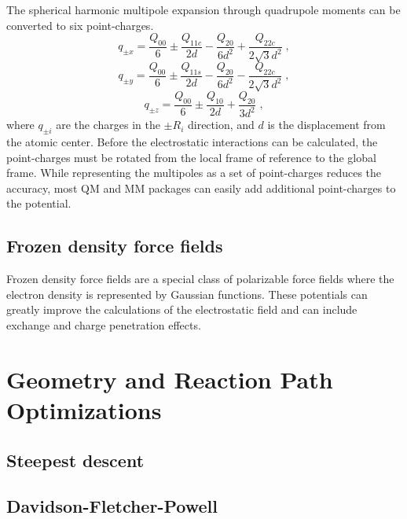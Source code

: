 \documentclass[12pt]{report}
\begin{document}
The spherical harmonic multipole expansion through quadrupole moments can be
converted to six point-charges. \cite{}
\begin{equation}
 q_{\pm x} = \frac{Q_{00}}{6} \pm \frac{Q_{11c}}{2d} -
          \frac{Q_{20}}{6d^2} + \frac{Q_{22c}}{2\sqrt{3}d^2} \; ,
\end{equation}
\begin{equation}
 q_{\pm y} = \frac{Q_{00}}{6} \pm \frac{Q_{11s}}{2d} -
          \frac{Q_{20}}{6d^2} - \frac{Q_{22c}}{2\sqrt{3}d^2} \; ,
\end{equation}
\begin{equation}
 q_{\pm z} = \frac{Q_{00}}{6} \pm \frac{Q_{10}}{2d} +
          \frac{Q_{20}}{3d^2} \; ,
\end{equation}
where $q_{\pm i}$ are the charges in the $\pm R_i$ direction, and $d$ is the
displacement from the atomic center. Before the electrostatic interactions can
be calculated, the point-charges must be rotated from the local frame of
reference to the global frame. While representing the multipoles as a set of
point-charges reduces the accuracy, most QM and MM packages can easily add
additional point-charges to the potential.

\subsection{Frozen density force fields}

Frozen density force fields are a special class of polarizable force fields
where the electron density is represented by Gaussian functions. These
potentials can greatly improve the calculations of the electrostatic field and
can include exchange and charge penetration effects.

\FloatBarrier

\section{Geometry and Reaction Path Optimizations}

\subsection{Steepest descent}



\subsection{Davidson-Fletcher-Powell}
\end{document}
